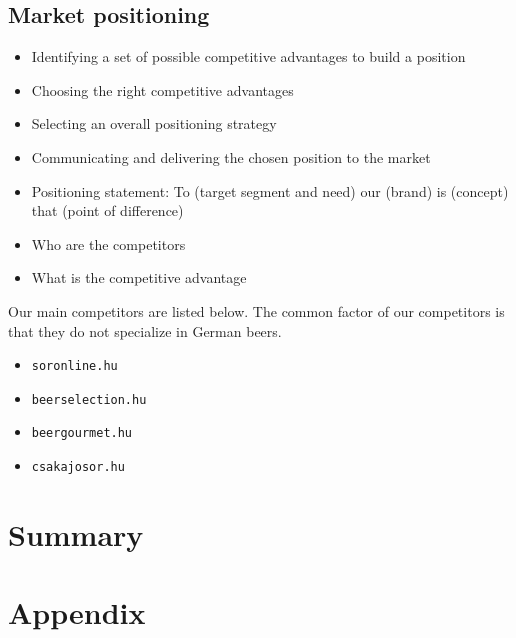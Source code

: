\subsection{Market positioning}

\begin{itemize}
   \item Identifying a set of possible competitive advantages to build a position
   \item Choosing the right competitive advantages
   \item Selecting an overall positioning strategy
   \item Communicating and delivering the chosen position to the market
   \item Positioning statement:  To (target segment and need) our (brand) is (concept) that (point of difference)
\end{itemize}

\begin{itemize}
   \item Who are the competitors
   \item What is the competitive advantage
\end{itemize}

Our main competitors are listed below. The common factor of our competitors is that they do not specialize in German beers.
\begin{itemize}
   \item \texttt{soronline.hu} \cite{soronline}
   \item \texttt{beerselection.hu} \cite{beerselection}
   \item \texttt{beergourmet.hu} \cite{beergourmet}
   \item \texttt{csakajosor.hu} \cite{csakajosor}
\end{itemize}


\section{Summary}



\section{Appendix}



